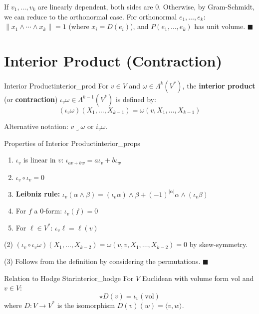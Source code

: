 \documentclass[11pt, letterpaper, openany]{book}
\renewenvironment{proof}[1][\proofname]{%
  \tcolorbox[blanker, breakable, left=1em,
    before skip=1em, after skip=1em,
    borderline west={2pt}{0pt}{MagicTeal!50},
    colback=MagicCream,
    before upper={\textcolor{MagicTeal}{\sffamily\bfseries #1.}\space}
  ]%
}{%
  \hfill\textcolor{MagicTeal}{\ensuremath{\blacksquare}}\endtcolorbox%
}
\begin{document}
\begin{proof}
If $v_1, \ldots, v_k$ are linearly dependent, both sides are 0. Otherwise, by Gram-Schmidt, we can reduce to the orthonormal case. For orthonormal $e_1, \ldots, e_k$: $\|x_1 \wedge \cdots \wedge x_k\| = 1$ (where $x_i = D(e_i)$), and $P(e_1, \ldots, e_k)$ has unit volume.
\end{proof}

\section{Interior Product (Contraction)}

\begin{defn}{Interior Product}{interior_prod}
For $v \in V$ and $\omega \in \Lambda^k(V^*)$, the \textbf{interior product} (or \textbf{contraction}) $\iota_v \omega \in \Lambda^{k-1}(V^*)$ is defined by:
\[(\iota_v \omega)(X_1, \ldots, X_{k-1}) = \omega(v, X_1, \ldots, X_{k-1})\]

Alternative notation: $v \lrcorner \omega$ or $i_v \omega$.
\end{defn}

\begin{thm}{Properties of Interior Product}{interior_props}
\begin{enumerate}
    \item $\iota_v$ is linear in $v$: $\iota_{av + bw} = a\iota_v + b\iota_w$
    \item $\iota_v \circ \iota_v = 0$
    \item \textbf{Leibniz rule:} $\iota_v(\alpha \wedge \beta) = (\iota_v \alpha) \wedge \beta + (-1)^{|\alpha|} \alpha \wedge (\iota_v \beta)$
    \item For $f$ a 0-form: $\iota_v(f) = 0$
    \item For $\ell \in V^*$: $\iota_v \ell = \ell(v)$
\end{enumerate}
\end{thm}

\begin{proof}
(2) $(\iota_v \circ \iota_v \omega)(X_1, \ldots, X_{k-2}) = \omega(v, v, X_1, \ldots, X_{k-2}) = 0$ by skew-symmetry.

(3) Follows from the definition by considering the permutations.
\end{proof}

\begin{thm}{Relation to Hodge Star}{interior_hodge}
For $V$ Euclidean with volume form $\text{vol}$ and $v \in V$:
\[\star D(v) = \iota_v(\text{vol})\]
where $D: V \to V^*$ is the isomorphism $D(v)(w) = \langle v, w \rangle$.
\end{thm}
\end{document}
